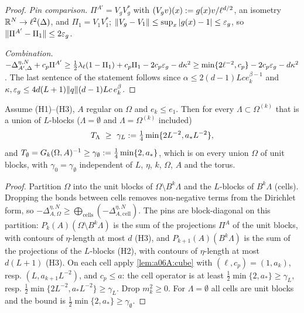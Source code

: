 \begin{proof}
\emph{Pin comparison.} $\Pi^{A'}=V_gV_g^*$ with $(V_gv)(x):= g(x)v/\ell^{d/2}$, an isometry $\mathbb R^N\to\ell^2(\Delta)$, and $\Pi_1=V_1V_1^*$; $\lVert V_g-V_1\rVert\le\sup_x|g(x)-1|\le\varepsilon_g$, so $\lVert \Pi^{A'}-\Pi_1\rVert\le2\varepsilon_g$.

\emph{Combination.} $-\Delta^{\eta,N}_{A',\Delta}+c_p\Pi^{A'}\ge\frac12\lambda_\ell(1-\Pi_1)+c_p\Pi_1-2c_p\varepsilon_g-d\kappa^2\ge\min\{2\ell^{-2},c_p\}-2c_p\varepsilon_g-d\kappa^2$. The last sentence of the statement follows since $\alpha\le2(d-1)Lce_k^{\beta-1}$ and $\kappa,\varepsilon_g\le4d(L+1)\lVert q\rVert(d-1)Lc\,e_k^\beta$.
\end{proof}

\begin{lemma}\label{lem:a06A:coer}
Assume (H1)--(H3), $A$ regular on $\Omega$ and $e_k\le e_1$. Then for every $\Lambda\subset\Omega^{(k)}$ that is a union of $L$-blocks ($\Lambda=\emptyset$ and $\Lambda=\Omega^{(k)}$ included)
\[
T_\Lambda\ \ge\ \gamma_L\defeq\tfrac14\min\{2L^{-2},a_*L^{-2}\},
\]
and $T_\emptyset=G_k(\Omega,A)^{-1}\ge\gamma_\emptyset:=\frac14\min\{2,a_*\}$, which is \cite[(1.8)]{Ba4} on every union $\Omega$ of unit blocks, with $\gamma_0=\gamma_\emptyset$ independent of $L$, $\eta$, $k$, $\Omega$, $A$ and the torus.
\end{lemma}

\begin{proof}
Partition $\Omega$ into the unit blocks of $\Omega\setminus B^k\Lambda$ and the $L$-blocks of $B^k\Lambda$ (cells). Dropping the bonds between cells removes non-negative terms from the Dirichlet form, so $-\Delta^{\eta,N}_{A,\Omega}\ge\bigoplus_{\text{cells}}(-\Delta^{\eta,N}_{A,\text{cell}})$. The pins are block-diagonal on this partition: $P_k(A)(\Omega\setminus B^k\Lambda)$ is the sum of the projections $\Pi^A$ of the unit blocks, with contours of $\eta$-length at most $d$ (H3), and $P_{k+1}(A)(B^k\Lambda)$ is the sum of the projections of the $L$-blocks (H2), with contours of $\eta$-length at most $d(L+1)$ (H3). On each cell apply \cref{lem:a06A:cube} with $(\ell,c_p)=(1,a_k)$, resp. $(L,a_{k+1}L^{-2})$, and $c_p\le a$: the cell operator is at least $\frac12\min\{2,a_*\}\ge\gamma_L$, resp. $\frac12\min\{2L^{-2},a_*L^{-2}\}\ge\gamma_L$. Drop $m_k^2\ge0$. For $\Lambda=\emptyset$ all cells are unit blocks and the bound is $\frac12\min\{2,a_*\}\ge\gamma_\emptyset$.
\end{proof}

